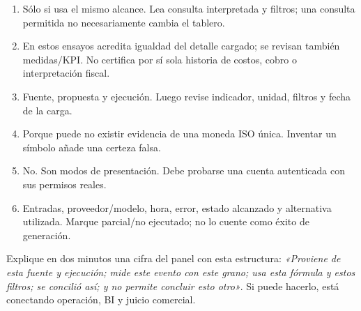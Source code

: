 {\begin{enumerate}
\item Sólo si usa el mismo alcance. Lea consulta interpretada y filtros; una consulta permitida no necesariamente cambia el tablero.
\item En estos ensayos acredita igualdad del detalle cargado; se revisan también medidas/KPI. No certifica por sí sola historia de costos, cobro o interpretación fiscal.
\item Fuente, propuesta y ejecución. Luego revise indicador, unidad, filtros y fecha de la carga.
\item Porque puede no existir evidencia de una moneda ISO única. Inventar un símbolo añade una certeza falsa.
\item No. Son modos de presentación. Debe probarse una cuenta autenticada con sus permisos reales.
\item Entradas, proveedor/modelo, hora, error, estado alcanzado y alternativa utilizada. Marque parcial/no ejecutado; no lo cuente como éxito de generación.
\end{enumerate}}
Explique en dos minutos una cifra del panel con esta estructura: \emph{«Proviene de esta fuente y ejecución; mide este evento con este grano; usa esta fórmula y estos filtros; se concilió así; y no permite concluir esto otro»}. Si puede hacerlo, está conectando operación, BI y juicio comercial.

